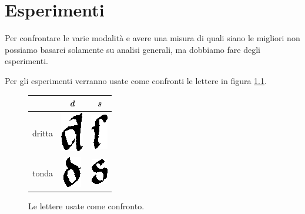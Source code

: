 \chapter{Esperimenti}\label{ch:experiments}

Per confrontare le varie modalit\`a e avere una misura di quali siano le migliori non possiamo basarci solamente su analisi generali, ma dobbiamo fare degli esperimenti.

Per gli esperimenti verranno usate come confronti le lettere in figura \ref{fig:letters}.

\begin{figure}
    \centering
    \begin{tabular}{c|c|c}
        & \emph{d} & \emph{s} \\ \hline
        dritta 
        & 
        \begin{minipage}{.3\textwidth}
            \centering
            \includegraphics{figures/D_dritta.png}
        \end{minipage}
        & 
        \begin{minipage}{.3\textwidth}
            \centering
            \includegraphics{figures/S_dritta.png}
        \end{minipage}
        \\ \hline
        tonda 
        & 
        \begin{minipage}{.3\textwidth}
            \centering
            \includegraphics{figures/D_tonda.png}
        \end{minipage}
        & 
        \begin{minipage}{.3\textwidth}
            \centering
            \includegraphics{figures/S_tonda.png}
        \end{minipage}
        
    \end{tabular}
    \caption{Le lettere usate come confronto.}
    \label{fig:letters}
\end{figure}

